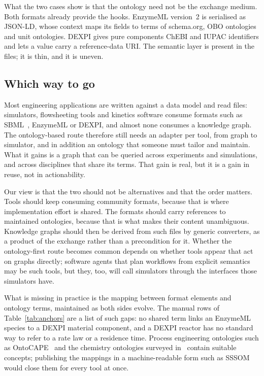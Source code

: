 \documentclass[preprint,12pt]{elsarticle}
\begin{document}
What the two cases show is that the ontology need not be the exchange
medium. Both formats already provide the hooks. EnzymeML version~2 is
serialised as JSON-LD, whose context maps its fields to terms of
schema.org, OBO ontologies and unit ontologies. DEXPI gives pure
components ChEBI and IUPAC identifiers and lets a value carry a
reference-data URI. The semantic layer is present in the files; it is
thin, and it is uneven.

\subsection{Which way to go}

Most engineering applications are written against a data model and read
files: simulators, flowsheeting tools and kinetics software consume
formats such as SBML~\cite{hucka2003}, EnzymeML or DEXPI, and almost none
consumes a knowledge graph. The ontology-based route therefore still needs
an adapter per tool, from graph to simulator, and in addition an ontology
that someone must tailor and maintain. What it gains is a graph that can
be queried across experiments and simulations, and across disciplines that
share its terms. That gain is real, but it is a gain in reuse, not in
actionability.

Our view is that the two should not be alternatives and that the order
matters. Tools should keep consuming community formats, because that is
where implementation effort is shared. The formats should carry references
to maintained ontologies, because that is what makes their content
unambiguous. Knowledge graphs should then be derived from such files by
generic converters, as a product of the exchange rather than a
precondition for it. Whether the ontology-first route becomes common
depends on whether tools appear that act on graphs directly; software
agents that plan workflows from explicit semantics may be such tools, but
they, too, will call simulators through the interfaces those simulators
have.

What is missing in practice is the mapping between format elements and
ontology terms, maintained as both sides evolve. The manual rows of
Table~\ref{tab:anchors} are a list of such gaps: no shared term links an
EnzymeML species to a DEXPI material component, and a DEXPI reactor has no
standard way to refer to a rate law or a residence time. Process
engineering ontologies such as OntoCAPE~\cite{morbach2007} and the
chemistry ontologies surveyed in~\cite{stroemert2022} contain suitable
concepts; publishing the mappings in a machine-readable form such as
SSSOM~\cite{matentzoglu2022} would close them for every tool at once.
\end{document}

